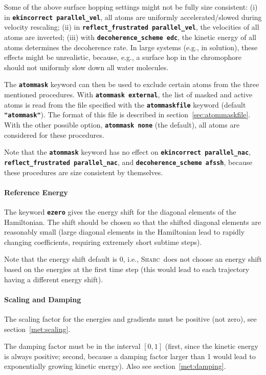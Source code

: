 \documentclass[a4paper,10pt,DIV=15,openany]{scrbook}
\newcommand{\sharc}{\textsc{Sharc}}
\newcommand{\ttt}[1]{\textbf{\texttt{#1}}}
\begin{document}
Some of the above surface hopping settings might not be fully size consistent: (i) in \ttt{ekincorrect parallel\_vel}, all atoms are uniformly accelerated/slowed during velocity rescaling; (ii) in \ttt{reflect\_frustrated parallel\_vel}, the velocities of all atoms are inverted; (iii) with \ttt{decoherence\_scheme edc}, the kinetic energy of all atoms determines the decoherence rate. In large systems (e.g., in solution), these effects might be unrealistic, because, e.g., a surface hop in the chromophore should not uniformly slow down all water molecules.

The \ttt{atommask} keyword can then be used to exclude certain atoms from the three mentioned procedures. With \ttt{atommask external}, the list of masked and active atoms is read from the file specified with the \ttt{atommaskfile} keyword (default \ttt{"atommask"}). The format of this file is described in section~\ref{sec:atommaskfile}. With the other possible option, \ttt{atommask none} (the default), all atoms are considered for these procedures.

Note that the \ttt{atommask} keyword has no effect on \ttt{ekincorrect parallel\_nac}, \ttt{reflect\_frustrated parallel\_nac}, and \ttt{decoherence\_scheme afssh}, because these procedures are size consistent by themselves.

\paragraph{Reference Energy}

The keyword \ttt{ezero} gives the energy shift for the diagonal elements of the Hamiltonian. The shift should be chosen so that the shifted diagonal elements are reasonably small (large diagonal elements in the Hamiltonian lead to rapidly changing coefficients, requiring extremely short subtime steps). 

Note that the energy shift default is 0, i.e., \sharc\ does not choose an energy shift based on the energies at the first time step (this would lead to each trajectory having a different energy shift).

\paragraph{Scaling and Damping}

The scaling factor for the energies and gradients must be positive (not zero), see section~\ref{met:scaling}.

The damping factor must be in the interval $[0,1]$ (first, since the kinetic energy is always positive; second, because a damping factor larger than 1 would lead to exponentially growing kinetic energy). Also see section~\ref{met:damping}.
\end{document}
